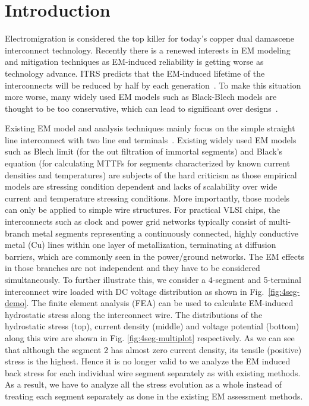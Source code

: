 \section{Introduction}
\label{sec:intro}

Electromigration is considered the top killer for today's copper dual
damascene interconnect technology. Recently there is a renewed
interests in EM modeling and mitigation techniques as EM-induced
reliability is getting worse as technology advance.  ITRS predicts that
the EM-induced lifetime of the interconnects will be reduced by half
by each generation~\cite{ITRS}. To make this situation more worse,
many widely used EM models such as Black-Blech models are thought to
be too conservative, which can lead to significant over
designs~\cite{Bailey:semieng}.

Existing EM model and analysis techniques mainly focus on the simple
straight line interconnect with two line end
terminals~\cite{deOrio:2010}.  Existing widely used EM models such as
Blech limit \cite{Blech:1976ko} (for the out filtration of immortal
segments) and Black's equation \cite{Black:1969fc} (for calculating
MTTFs for segments characterized by known current densities and
temperatures) are subjects of the hard criticism
\cite{Ohring:1998uj}\cite{Lloyd:2008je}\cite{Hauschildt:2013cv} as
those empirical models are stressing condition dependent and lacks of
scalability over wide current and temperature stressing
conditions. More importantly, those models can only be applied to
simple wire structures.  For practical VLSI chips, the interconnects
such as clock and power grid networks typically consist of
multi-branch metal segments representing a continuously connected,
highly conductive metal (Cu) lines within one layer of metallization,
terminating at diffusion barriers, which are commonly seen in the
power/ground networks.  The EM effects in those branches are not
independent and they have to be considered simultaneously.  To further
illustrate this, we consider a 4-segment and 5-terminal interconnect
wire loaded with DC voltage distribution as shown in
Fig.~\ref{fig:4seg-demo}. The finite element analysis (FEA) can be
used to calculate EM-induced hydrostatic stress along the interconnect
wire.  The distributions of the hydrostatic stress (top), current
density (middle) and voltage potential (bottom) along this wire are
shown in Fig. \ref{fig:4seg-multiplot} respectively. As we can see
that although the segment 2 has almost zero current density, its
tensile (positive) stress is the highest. Hence it is no longer valid
to we analyze the EM induced back stress for each individual wire
segment separately as with existing methods. As a result, we have to
analyze all the stress evolution as a whole instead of treating each
segment separately as done in the existing EM assessment methods.

